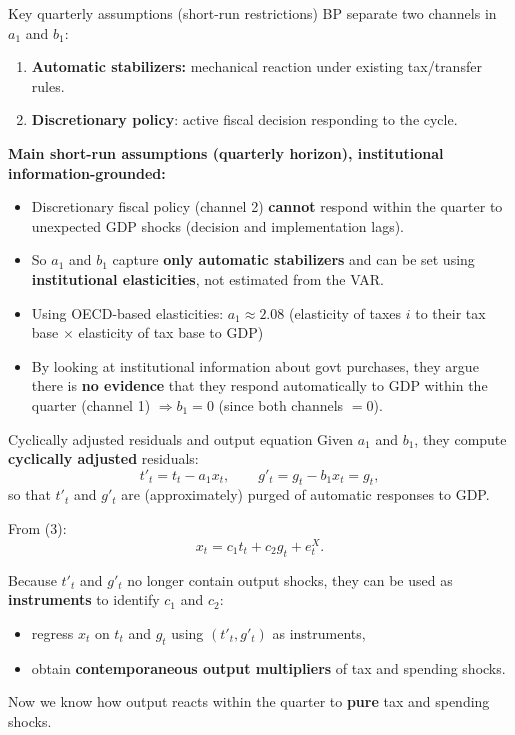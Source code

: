 \documentclass{beamer}
\begin{document}
\begin{frame}{Key quarterly assumptions (short-run restrictions)}
\small
BP separate two channels in $a_1$ and $b_1$:
\begin{enumerate}
  \item \textbf{Automatic stabilizers:} mechanical reaction under existing tax/transfer rules.
  \item \textbf{Discretionary policy}: active fiscal decision responding to the cycle.
\end{enumerate}

\medskip
\textbf{Main short-run assumptions (quarterly horizon), institutional information-grounded:}
\begin{itemize}
  \item Discretionary fiscal policy (channel 2) \textbf{cannot} respond
        within the quarter to unexpected GDP shocks (decision and implementation lags).
  \item So $a_1$ and $b_1$ capture \textbf{only automatic stabilizers} and can be set
        using \textbf{institutional elasticities}, not estimated from the VAR.
  \item Using OECD-based elasticities: $a_1 \approx 2.08$ (elasticity of taxes $i$ to their tax base $\times$ elasticity of tax base to GDP)
  \item  By looking at institutional information about govt purchases, they argue there is \textbf{no evidence} that they respond automatically to GDP within the quarter (channel 1) $\Rightarrow b_1 = 0$ (since both channels $=0$).
\end{itemize}
\end{frame}

\begin{frame}{Cyclically adjusted residuals and output equation}
\small
Given $a_1$ and $b_1$, they compute \textbf{cyclically adjusted} residuals:
\[
t'_t = t_t - a_1 x_t, \qquad
g'_t = g_t - b_1 x_t = g_t,
\]
so that $t'_t$ and $g'_t$ are (approximately) purged of automatic
responses to GDP.

\medskip
From (3):
\[
x_t = c_1 t_t + c_2 g_t + e^X_t.
\]

Because $t'_t$ and $g'_t$ no longer contain output shocks, they can be
used as \textbf{instruments} to identify $c_1$ and $c_2$:
\begin{itemize}
  \item regress $x_t$ on $t_t$ and $g_t$ using $(t'_t, g'_t)$ as instruments,
  \item obtain \textbf{contemporaneous output multipliers} of tax and spending shocks.
\end{itemize}

\medskip
Now we know how output reacts within the quarter to \textbf{pure} tax and spending shocks.
\end{frame}
\end{document}
